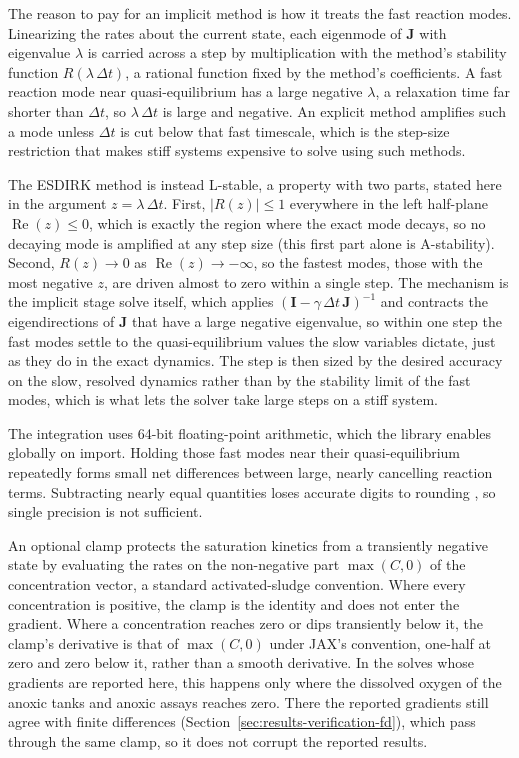\documentclass{article}
\begin{document}
The reason to pay for an implicit method is how it treats the fast reaction modes. Linearizing the rates about the current state, each eigenmode of \(\mathbf{J}\) with eigenvalue \(\lambda\) is carried across a step by multiplication with the method's stability function \(R(\lambda\,\Delta t)\), a rational function fixed by the method's coefficients. A fast reaction mode near quasi-equilibrium has a large negative \(\lambda\), a relaxation time far shorter than \(\Delta t\), so \(\lambda\,\Delta t\) is large and negative. An explicit method amplifies such a mode unless \(\Delta t\) is cut below that fast timescale, which is the step-size restriction that makes stiff systems expensive to solve using such methods. 

The ESDIRK method is instead L-stable, a property with two parts, stated here in the argument \(z=\lambda\,\Delta t\). First, \(\lvert R(z)\rvert\le 1\) everywhere in the left half-plane \(\operatorname{Re}(z)\le 0\), which is exactly the region where the exact mode decays, so no decaying mode is amplified at any step size (this first part alone is A-stability). Second, \(R(z)\to 0\) as \(\operatorname{Re}(z)\to-\infty\), so the fastest modes, those with the most negative \(z\), are driven almost to zero within a single step. The mechanism is the implicit stage solve itself, which applies \((\mathbf{I}-\gamma\,\Delta t\,\mathbf{J})^{-1}\) and contracts the eigendirections of \(\mathbf{J}\) that have a large negative eigenvalue, so within one step the fast modes settle to the quasi-equilibrium values the slow variables dictate, just as they do in the exact dynamics. The step is then sized by the desired accuracy on the slow, resolved dynamics rather than by the stability limit of the fast modes, which is what lets the solver take large steps on a stiff system. 

The integration uses 64-bit floating-point arithmetic, which the library enables globally on import. Holding those fast modes near their quasi-equilibrium repeatedly forms small net differences between large, nearly cancelling reaction terms. Subtracting nearly equal quantities loses accurate digits to rounding \citep{goldberg1991}, so single precision is not sufficient. 

An optional clamp protects the saturation kinetics from a transiently negative state by evaluating the rates on the non-negative part \(\max(C,0)\) of the concentration vector, a standard activated-sludge convention. Where every concentration is positive, the clamp is the identity and does not enter the gradient. Where a concentration reaches zero or dips transiently below it, the clamp's derivative is that of \(\max(C,0)\) under JAX's convention, one-half at zero and zero below it, rather than a smooth derivative. In the solves whose gradients are reported here, this happens only where the dissolved oxygen of the anoxic tanks and anoxic assays reaches zero. There the reported gradients still agree with finite differences (Section~\ref{sec:results-verification-fd}), which pass through the same clamp, so it does not corrupt the reported results.
\end{document}
